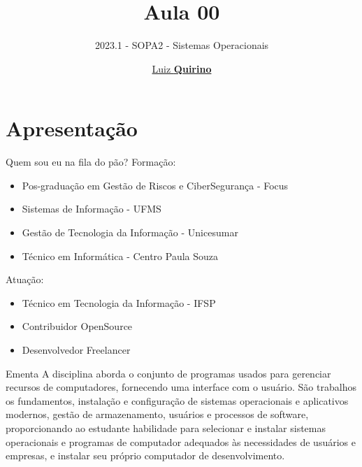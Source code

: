 \documentclass{beamer}
\title{Aula 00}
\subtitle{2023.1 - SOPA2 - Sistemas Operacionais}
\author{\href{mailto:luizfpq@gmail.com}{Luiz \textbf{Quirino}}}
\newcommand{\hrefcol}[2]{\textcolor{cyan}{\href{#1}{#2}}}
\begin{document}
\maketitle

%
%




\section{Apresentação}

\begin{frame}{Quem sou eu na fila do pão?}
Formação:
\begin{itemize}
\item Pos-graduação em Gestão de Riscos e CiberSegurança - Focus
\item Sistemas de Informação - UFMS
\item Gestão de Tecnologia da Informação - Unicesumar
\item Técnico em Informática - Centro Paula Souza
\end{itemize}
Atuação:
\begin{itemize}
\item Técnico em Tecnologia da Informação - IFSP
\item Contribuidor OpenSource
\item Desenvolvedor Freelancer
\end{itemize}

\end{frame}

\begin{frame}{Ementa}\justifying
      A disciplina aborda o conjunto de programas usados para gerenciar recursos de
computadores, fornecendo uma interface com o usuário. São trabalhos os fundamentos,
instalação e configuração de sistemas operacionais e aplicativos modernos, gestão de
armazenamento, usuários e processos de software, proporcionando ao estudante habilidade
para selecionar e instalar sistemas operacionais e programas de computador adequados às
necessidades de usuários e empresas, e instalar seu próprio computador de
desenvolvimento.
\end{frame}
\end{document}
